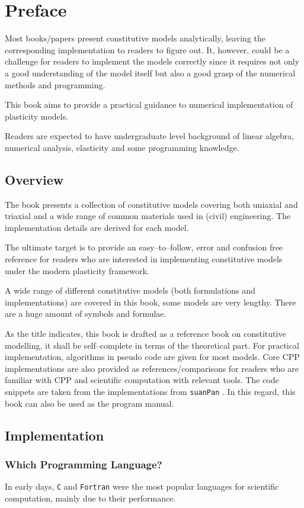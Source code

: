 \chapter{Preface}
Most books/papers present constitutive models analytically, leaving the corresponding implementation to readers to figure out.
It, however, could be a challenge for readers to implement the models correctly since it requires not only a good understanding of the model itself but also a good grasp of the numerical methods and programming.

This book aims to provide a practical guidance to numerical implementation of plasticity models.

Readers are expected to have undergraduate level background of linear algebra, numerical analysis, elasticity and some programming knowledge.
\section{Overview}
The book presents a collection of constitutive models covering both uniaxial and triaxial and a wide range of common materials used in (civil) engineering.
The implementation details are derived for each model.

The ultimate target is to provide an easy--to--follow, error and confusion free reference for readers who are interested in implementing constitutive models under the modern plasticity framework.

A wide range of different constitutive models (both formulations and implementations) are covered in this book, some models are very lengthy.
There are a huge amount of symbols and formulae.

As the title indicates, this book is drafted as a reference book on constitutive modelling, it shall be self--complete in terms of the theoretical part.
For practical implementation, algorithms in pseudo code are given for most models.
Core CPP implementations are also provided as references/comparisons for readers who are familiar with CPP and scientific computation with relevant tools.
The code snippets are taken from the implementations from \texttt{suanPan} \cite{Chang2022}.
In this regard, this book can also be used as the program manual.
\section{Implementation}
\subsection{Which Programming Language?}
In early days, \texttt{C} and \texttt{Fortran} were the most popular languages for scientific computation, mainly due to their performance.

